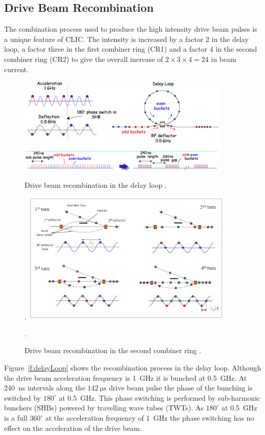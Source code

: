 \subsection{Drive Beam Recombination}
\label{ss:clicCombination}

The combination process used to produce the high intensity drive beam pulses is a unique feature of CLIC. The intensity is increased by a factor 2 in the delay loop, a factor three in the first combiner ring (CR1) and a factor 4 in the second combiner ring (CR2) to give the overall increase of \(2 \times 3 \times 4 = 24\) in beam current. 

\begin{figure}
  \centering
  \includegraphics[width=0.9\textwidth]{Figures/introduction/delayLoop}
  \caption{Drive beam recombination in the delay loop \cite{clicCDR}.}.
  \label{f:delayLoop}
    \includegraphics[width=0.9\textwidth]{Figures/introduction/combinerRing}
  \caption{Drive beam recombination in the second combiner ring \cite{clicCDR}.}.
  \label{f:combinerRing}
\end{figure}

Figure~\ref{f:delayLoop} shows the recombination process in the delay loop. Although the drive beam acceleration frequency is 1~GHz it is bunched at 0.5~GHz. At 240~ns intervals along the \(142~\mathrm{\mu s}\) drive beam pulse the phase of the bunching is switched by \(180^\circ\) at 0.5~GHz. This phase switching is performed by sub-harmonic bunchers (SHBs) powered by travelling wave tubes (TWTs). As \(180^\circ\) at 0.5~GHz is a full \(360^\circ\) at the acceleration frequency of 1~GHz the phase switching has no effect on the acceleration of the drive beam. 

